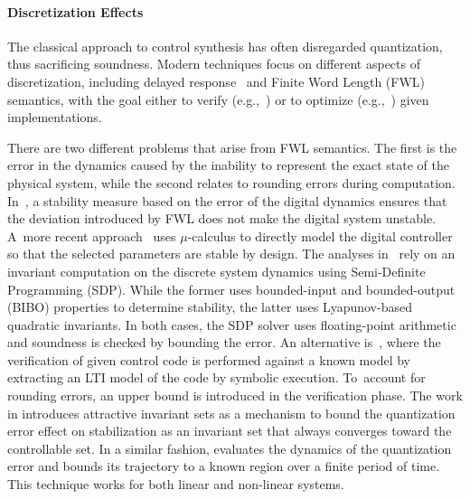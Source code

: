 \documentclass[runningheads,a4paper]{llncs}
\begin{document}

\paragraph{Discretization Effects}

The classical approach to control synthesis has often disregarded
quantization, thus sacrificing soundness.  Modern techniques focus on
different aspects of discretization, including delayed
response~\cite{Duggirala2015} and Finite Word Length (FWL) semantics, with
the goal either to verify (e.g.,~\cite{daes20161}) or to optimize
(e.g.,~\cite{oudjida2014design}) given implementations.

There are two different problems that arise from FWL semantics.  The first
is the error in the dynamics caused by the inability to represent the exact
state of the physical system, while the second relates to rounding errors
during computation.  In~\cite{fialho1994stability}, a stability measure
based on the error of the digital dynamics ensures that the deviation
introduced by FWL does not make the digital system unstable.  A~more recent
approach~\cite{DBLP:journals/automatica/WuLCC09} uses $\mu$-calculus to
directly model the digital controller so that the selected parameters are
stable by design.  The analyses in~\cite{DBLP:conf/hybrid/RouxJG15,
DBLP:conf/hybrid/WangGRJF16} rely on an invariant computation on the
discrete system dynamics using Semi-Definite Programming (SDP).  While the
former uses bounded-input and bounded-output (BIBO) properties to determine
stability, the latter uses Lyapunov-based quadratic invariants.  In both
cases, the SDP solver uses floating-point arithmetic and soundness is
checked by bounding the error.  An alternative is~\cite{park2016scalable},
where the verification of given control code is performed against a known
model by extracting an LTI model of the code by symbolic execution. 
To~account for rounding errors, an upper bound is introduced in the
verification phase.  The work in \cite{picasso2003stabilization,
picasso2002construction} introduces attractive invariant sets as a mechanism
to bound the quantization error effect on stabilization as an invariant set
that always converges toward the controllable set.  In a similar fashion,
\cite{liberzon2003hybrid} evaluates the dynamics of the quantization error
and bounds its trajectory to a known region over a finite period of time. 
This technique works for both linear and non-linear systems.
\end{document}
